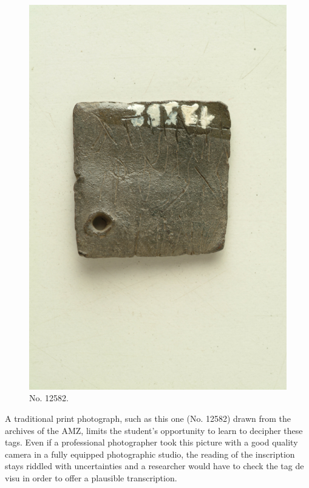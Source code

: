 \documentclass[amsthm,ebook]{saparticle}
\begin{document}
\begin{figure}[!h]
\includegraphics[scale=0.25]{EAGLE16lameetalteaching-img002.jpg}
\caption{No. 12582.}
\label{fig:12582}
\end{figure}

A traditional print photograph, such as this one (No. 12582) drawn from the archives of the AMZ, limits the student’s
opportunity to learn to decipher these tags. Even if a professional photographer took this picture with a good quality
camera in a fully equipped photographic studio, the reading of the inscription stays riddled with uncertainties and a
researcher would have to check the tag de visu in order to offer a plausible transcription.
\end{document}
